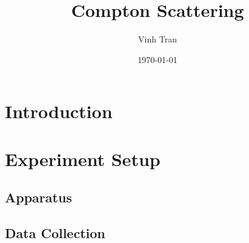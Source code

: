 \documentclass[aps,twocolumn,secnumarabic,balancelastpage,amsmath,amssymb,nofootinbib,floatfix]{revtex4-1}
\begin{document}
\title{Compton Scattering}

\author{Vinh Tran}

\date{\today}


\begin{abstract}



\end{abstract}

\maketitle


\section{Introduction}
\label{sec:intro}




\section{Experiment Setup}
\label{sec:experiment}

\subsection{Apparatus}
\label{sec:apparatus}



\subsection{Data Collection}
\label{sec:data_collection}
\end{document}
